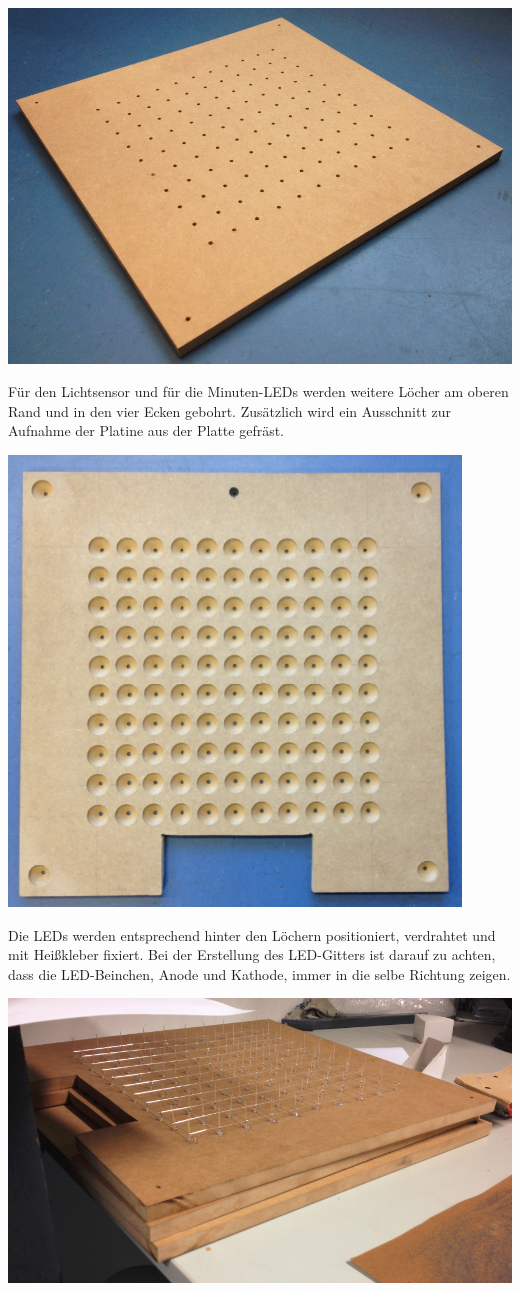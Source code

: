 \begin{multicols}{2}
{
\centering
\includegraphics[width=0.8\columnwidth]{Abbildungen/Konstruktion/Platte02}

}
Für den Lichtsensor und für die Minuten-LEDs werden weitere Löcher am oberen Rand und in den vier Ecken gebohrt. Zusätzlich wird ein Ausschnitt zur Aufnahme der Platine aus der Platte gefräst.

{
\centering
\includegraphics[width=0.85\columnwidth]{Abbildungen/Konstruktion/Platte03}

}
Die LEDs werden entsprechend hinter den Löchern positioniert, verdrahtet und mit Heißkleber fixiert. Bei der Erstellung des LED-Gitters ist darauf zu achten, dass die LED-Beinchen, Anode und Kathode, immer in die selbe Richtung zeigen.

{
\centering
\includegraphics[width=0.85\columnwidth]{Abbildungen/Konstruktion/LED01}

}
\end{multicols}

